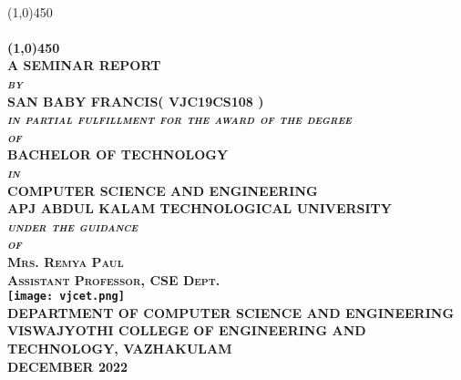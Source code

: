 \documentclass[10pt,a4paper]{report}
\begin{document}
	\begin{center}
	\textsc{\large\mdseries}\\
	\line(1,0){450}\\
	[0.20in]
	\Large\bfseries\textbf{}\\
	[0.20mm]
	\line(1,0){450}\\
	[1cm]
	\textsc{\large\mdseries A SEMINAR REPORT}\\	
	[0.20cm]
	\textsc{\large\itshape\mdseries by}\\	
	[0.20cm]
	\textsc{\large SAN BABY FRANCIS( VJC19CS108 )}\\
	[0.30cm]
	\textsc{\large\itshape\mdseries in partial fulfillment for the award of the degree}\\
	[0.25cm]
	\textsc{\large\itshape\mdseries of}\\
	[0.25cm]
	\textsc{\large\bfseries BACHELOR OF TECHNOLOGY}\\
	[0.25cm]
	\textsc{\large\itshape\mdseries in}\\
	[0.25cm]
	\textsc{\large\bfseries COMPUTER SCIENCE AND ENGINEERING}\\
	[0.20cm]
	\textsc{\large\bfseries APJ ABDUL KALAM TECHNOLOGICAL UNIVERSITY}\\
	[0.15cm]
	\textsc{\large\itshape\mdseries under the guidance}\\
	[0.25cm]
	\textsc{\large\itshape\mdseries of}\\
	[0.25cm]
	\textsc{\large\bfseries\upshape Mrs. Remya Paul}\\
	[0.10cm]
	\textsc{\large\bfseries\upshape Assistant Professor, CSE Dept.}\\
	[1cm]
	\texttt{[image: vjcet.png]}\\
	[1cm]
	\textsc{\large\bfseries DEPARTMENT OF COMPUTER SCIENCE AND ENGINEERING}\\
	[0.05cm]
	\textsc{\large\bfseries VISWAJYOTHI COLLEGE OF ENGINEERING AND}\\
	[0.05cm]
	\textsc{\large\bfseries TECHNOLOGY, VAZHAKULAM}\\
	[1cm]
	\textsc{\large\bfseries DECEMBER 2022}\\

	
	\end{center}

\thispagestyle{empty}


\newpage
\thispagestyle{empty}
\end{document}
